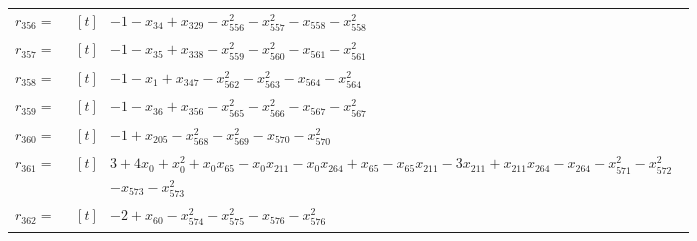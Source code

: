 \begin{longtable}{@{}r p{0.92\linewidth}@{}}
$r_{356}=$ & $\begin{aligned}[t]&-1-x_{34}+x_{329}-x_{556}^{2}-x_{557}^{2}-x_{558}-x_{558}^{2}\end{aligned}$ \\[2pt]
$r_{357}=$ & $\begin{aligned}[t]&-1-x_{35}+x_{338}-x_{559}^{2}-x_{560}^{2}-x_{561}-x_{561}^{2}\end{aligned}$ \\[2pt]
$r_{358}=$ & $\begin{aligned}[t]&-1-x_{1}+x_{347}-x_{562}^{2}-x_{563}^{2}-x_{564}-x_{564}^{2}\end{aligned}$ \\[2pt]
$r_{359}=$ & $\begin{aligned}[t]&-1-x_{36}+x_{356}-x_{565}^{2}-x_{566}^{2}-x_{567}-x_{567}^{2}\end{aligned}$ \\[2pt]
$r_{360}=$ & $\begin{aligned}[t]&-1+x_{205}-x_{568}^{2}-x_{569}^{2}-x_{570}-x_{570}^{2}\end{aligned}$ \\[2pt]
$r_{361}=$ & $\begin{aligned}[t]&3+4x_{0}+x_{0}^{2}+x_{0}x_{65}-x_{0}x_{211}-x_{0}x_{264}+x_{65}-x_{65}x_{211}-3x_{211}+x_{211}x_{264}-x_{264}-x_{571}^{2}-x_{572}^{2}\\[-1pt] &-x_{573}-x_{573}^{2}\end{aligned}$ \\[2pt]
$r_{362}=$ & $\begin{aligned}[t]&-2+x_{60}-x_{574}^{2}-x_{575}^{2}-x_{576}-x_{576}^{2}\end{aligned}$ \\[2pt]
\end{longtable}
\endgroup
